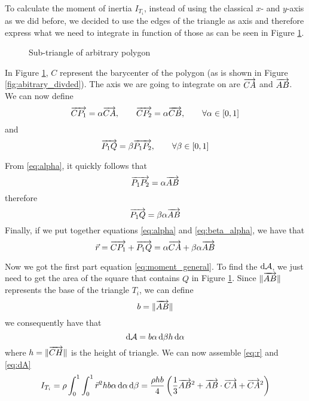 To calculate the moment of inertia $I_{T_i}$, instead of using the classical
$x$- and $y$-axis as we did before, we decided to use the edges of the triangle
as axis and therefore express what we need to integrate in function of those as
can be seen in Figure \ref{fig:abitrary_subtriangle}.
\begin{figure}[H]
	\centering
	\caption{Sub-triangle of arbitrary polygon}
	\label{fig:abitrary_subtriangle}
\end{figure}

In Figure \ref{fig:abitrary_subtriangle}, $C$ represent the barycenter of the
polygon (as is shown in Figure \ref{fig:abitrary_divded}). The axis we are going
to integrate on are $\overrightarrow{CA}$ and $\overrightarrow{AB}$.
We can now define
\begin{equation} \label{eq:alpha}
	\overrightarrow{CP_1} = \alpha \overrightarrow{CA}, \qquad \overrightarrow{CP_2} = \alpha
	\overrightarrow{CB}, \qquad \forall \alpha \in [0, 1]
\end{equation}
and
$$ \overrightarrow{P_1Q} = \beta \overrightarrow{P_1P_2}, \qquad \forall \beta \in [0, 1] $$

From \ref{eq:alpha}, it quickly follows that
\[
	\overrightarrow{P_1P_2} = \alpha \overrightarrow{AB}
\]
therefore
\begin{equation} \label{eq:beta_alpha}
	\overrightarrow{P_1Q} = \beta \alpha \overrightarrow{AB}
\end{equation}
Finally, if we put together equations \ref{eq:alpha} and \ref{eq:beta_alpha}, we
have that
\begin{equation}\label{eq:r}
	\vec r = \overrightarrow{CP_1} + \overrightarrow{P_1Q} = \alpha \overrightarrow{CA} + \beta \alpha \overrightarrow{AB}
\end{equation}

Now we got the first part equation \ref{eq:moment_general}. To find the $\mathop{}\!\mathrm{d}
	\mathcal A$, we
just need to get the area of the square that contains $Q$ in Figure
\ref{fig:abitrary_subtriangle}. Since $\|\overrightarrow{AB}\|$ represents the base of the
triangle $T_i$, we can define
$$ b = \| \overrightarrow{AB}\| $$
we consequently have that
\begin{equation} \label{eq:dA}
	\mathop{}\!\mathrm{d} \mathcal{A} = b \alpha \mathop{}\!\mathrm{d} \beta h\mathop{}\!\mathrm{d} \alpha
\end{equation}
where $h = \| \overrightarrow{CH} \|$ is the height of triangle.
We can now assemble \ref{eq:r} and \ref{eq:dA}
\begin{equation}
	\label{eq:subtriangle_arbitrary_moment}
	I_{T_i} = \rho \int_0^1 \int_0^1 \vec r^2 hb \alpha  \mathop{}\!\mathrm{d} \alpha
	\mathop{}\!\mathrm{d} \beta = \frac{\rho h b}{4} \left(\frac{1}{3} \overrightarrow{AB}^2 +
	\overrightarrow{AB} \cdot \overrightarrow{CA} + \overrightarrow{CA}^2\right)
\end{equation}

